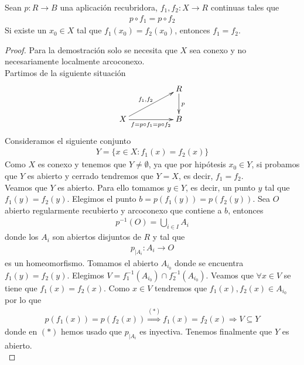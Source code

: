 \begin{lema}
    Sean $p:R \to B$ una aplicación recubridora, $f_1,f_2:X\to R$ continuas tales que 
    \begin{gather*}
        p\circ f_1 = p\circ f_2
    \end{gather*}
    Si existe un $x_0\in X$ tal que $f_1(x_0)=f_2(x_0)$, entonces $f_1=f_2$.

    \begin{proof}
        Para la demostración solo se necesita que $X$ sea conexo y no necesariamente localmente arcoconexo. \\

        Partimos de la siguiente situación
        \begin{gather*}
            \xymatrix{
                && R \ar[d]^{p}\\
                X \ar[urr]^{f_1,f_2} \ar[rr]_{f=p\circ f_1 = p\circ f_2} && B
            }
        \end{gather*}
        Consideramos el siguiente conjunto
        \begin{gather*}
            Y=\{x\in X : f_1(x)=f_2(x)\}
        \end{gather*}
        Como $X$ es conexo y tenemos que $Y \neq \emptyset$, ya que por hipótesis $x_0\in Y$, si probamos que $Y$ es abierto y cerrado tendremos que $Y=X$, es decir, $f_1=f_2$. \\
        
        Veamos que $Y$ es abierto. Para ello tomamos $y\in Y$, es decir, un punto $y$ tal que $f_1(y)=f_2(y)$. Elegimos el punto $b=p(f_1(y))=p(f_2(y))$. Sea $O$ abierto regularmente recubierto y arcoconexo que contiene a $b$, entonces 
        \begin{gather*}
            p^{-1}(O) = \bigcup\limits_{i\in I} A_i
        \end{gather*}
        donde los $A_i$ son abiertos disjuntos de $R$ y tal que 
        \begin{gather*}
            p_{|A_i}: A_i \to O
        \end{gather*} 
        es un homeomorfismo. Tomamos el abierto $A_{i_0}$ donde se encuentra $f_1(y)=f_2(y)$. Elegimos $V=f_1^{-1}(A_{i_0}) \cap f_2^{-1}(A_{i_0})$. Veamos que $\forall x \in V$ se tiene que $f_1(x)=f_2(x)$. Como $x\in V$ tendremos que $f_1(x),f_2(x)\in A_{i_0}$ por lo que 
        \begin{gather*}
            p(f_1(x)) = p(f_2(x)) \overset{(\ast)}{\Rightarrow} f_1(x)=f_2(x) \Rightarrow V\subseteq Y
        \end{gather*}
        donde en $(\ast)$ hemos usado que $p_{|A_i}$ es inyectiva. Tenemos finalmente que $Y$ es abierto.\\


\end{proof}
\end{lema}
